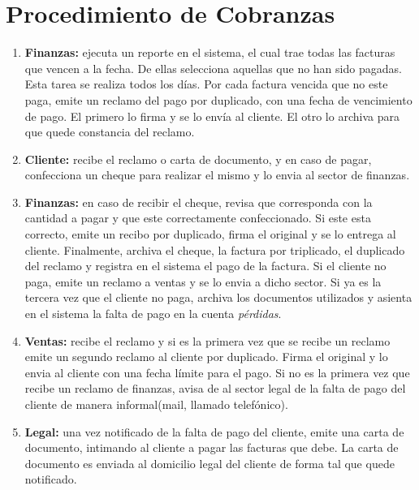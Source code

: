 \section{Procedimiento de Cobranzas}
\begin{enumerate}
  \item \textbf{Finanzas:} ejecuta un reporte en el sistema, el cual trae todas las facturas que vencen a la fecha. De ellas selecciona aquellas que no han sido pagadas. Esta tarea se realiza todos los días.
  Por cada factura vencida que no este paga, emite un reclamo del pago por duplicado, con una fecha de vencimiento de pago. El primero lo firma y se lo envía al cliente. El otro lo archiva para que quede constancia del reclamo.
  \item \textbf{Cliente:} recibe el reclamo o carta de documento, y en caso de pagar, confecciona un cheque para realizar el mismo y lo envia al sector de finanzas.
  \item \textbf{Finanzas:} en caso de recibir el cheque, revisa que corresponda con la cantidad a pagar y que este correctamente confeccionado. Si este esta correcto, emite un recibo por duplicado, firma el original y se lo entrega al cliente. Finalmente, archiva el cheque, la factura por triplicado, el duplicado del reclamo y registra en el sistema el pago de la factura.
  Si el cliente no paga, emite un reclamo a ventas y se lo envia a dicho sector. Si ya es la tercera vez que el cliente no paga, archiva los documentos utilizados y asienta en el sistema la falta de pago en la cuenta \textit{pérdidas}.
  \item \textbf{Ventas:} recibe el reclamo y si es la primera vez que se recibe un reclamo emite un segundo reclamo al cliente por duplicado. Firma el original y lo envia al cliente con una fecha límite para el pago. Si no es la primera vez que recibe un reclamo de finanzas, avisa de al sector legal de la falta de pago del cliente de manera informal(mail, llamado telefónico).
  \item \textbf{Legal:} una vez notificado de la falta de pago del cliente, emite una carta de documento, intimando al cliente a pagar las facturas que debe. La carta de documento es enviada al domicilio legal del cliente de forma tal que quede notificado.
\end{enumerate}


\pagebreak
